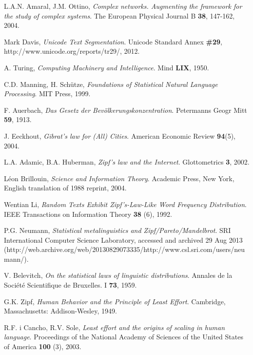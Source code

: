 \begin{thebibliography}{99}
	L.A.N. Amaral, J.M. Ottino,
	\emph{Complex networks. Augmenting the framework for the study of complex systems}.
	The European Physical Journal B \textbf{38}, 147-162,
	2004.
	
  Mark Davis,
  \emph{Unicode Text Segmentation}.
  Unicode Standard Annex \textbf{\#29}, http://www.unicode.org/reports/tr29/,
  2012.
  
  A. Turing,
  \emph{Computing Machinery and Intelligence}.
  Mind \textbf{LIX},
  1950.

  C.D. Manning, H. Schütze,
  \emph{Foundations of Statistical Natural Language Processing}.
  MIT Press,
  1999.

  F. Auerbach,
  \emph{Das Gesetz der Bevölkerungskonzentration}.
  Petermanns Geogr Mitt \textbf{59},
  1913.

  J. Eeckhout,
  \emph{Gibrat's law for (All) Cities}.
  American Economic Review \textbf{94}(5),
  2004.

  L.A. Adamic, B.A. Huberman,
  \emph{Zipf’s law and the Internet}.
  Glottometrics \textbf{3},
  2002.

  Léon Brillouin,
  \emph{Science and Information Theory}.
  Academic Press, New York,
  English translation of 1988 reprint,
  2004.

  Wentian Li,
  \emph{Random Texts Exhibit Zipf's-Law-Like Word Frequency Distribution}.
  IEEE Transactions on Information Theory \textbf{38} (6),
  1992.

  P.G. Neumann,
  \emph{Statistical metalinguistics and Zipf/Pareto/Mandelbrot}.
  SRI International Computer Science Laboratory,
  accessed and archived 29 Aug 2013 (http://web.archive.org/web/20130829073335/http://www.csl.sri.com/users/neumann/).

  V. Belevitch,
  \emph{On the statistical laws of linguistic distributions}.
  Annales de la Société Scientifique de Bruxelles. I \textbf{73},
  1959.

  G.K. Zipf,
  \emph{Human Behavior and the Principle of Least Effort}.
  Cambridge, Massachusetts: Addison-Wesley,
  1949.

  R.F. i Cancho, R.V. Sole,
  \emph{Least effort and the origins of scaling in human language}.
  Proceedings of the National Academy of Sciences of the United States of America \textbf{100} (3),
  2003.


\end{thebibliography}
